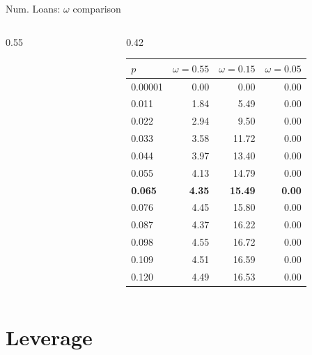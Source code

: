 \documentclass[aspectratio=169,10pt]{beamer}
\begin{document}
\begin{frame}{Num. Loans: $\omega$ comparison}
\begin{columns}[T]
\begin{column}{0.55\textwidth}
\begin{figure}
      \end{figure}
    \end{column}
    \begin{column}{0.42\textwidth}
      \footnotesize\renewcommand{\arraystretch}{0.85}\setlength{\tabcolsep}{3pt}
      \begin{tabular}{lrrr}
        \toprule
        $p$ & $\omega=0.55$ & $\omega=0.15$ & $\omega=0.05$ \\
        \midrule
        0.00001 & 0.00 & 0.00 & 0.00 \\
        0.011 & 1.84 & 5.49 & 0.00 \\
        0.022 & 2.94 & 9.50 & 0.00 \\
        0.033 & 3.58 & 11.72 & 0.00 \\
        0.044 & 3.97 & 13.40 & 0.00 \\
        0.055 & 4.13 & 14.79 & 0.00 \\
        \textbf{0.065} & \textbf{4.35} & \textbf{15.49} & \textbf{0.00} \\
        0.076 & 4.45 & 15.80 & 0.00 \\
        0.087 & 4.37 & 16.22 & 0.00 \\
        0.098 & 4.55 & 16.72 & 0.00 \\
        0.109 & 4.51 & 16.59 & 0.00 \\
        0.120 & 4.49 & 16.53 & 0.00 \\
        \bottomrule
      \end{tabular}
    \end{column}
  \end{columns}
\end{frame}

\section{Leverage}
\end{document}
